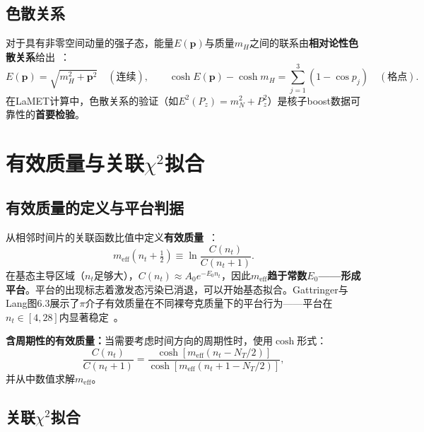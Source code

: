 \documentclass[12pt,a4paper]{ctexart}
\theoremstyle{definition}
\begin{document}
\subsection{色散关系}

对于具有非零空间动量的强子态，能量$E(\mathbf{p})$与质量$m_H$之间的联系由\textbf{相对论性色散关系}给出~\cite{GattringerLang2010}：
\begin{equation}
E(\mathbf{p}) = \sqrt{m_H^2 + \mathbf{p}^2} \quad (\text{连续}), \qquad
\cosh E(\mathbf{p}) - \cosh m_H = \sum_{j=1}^3 (1 - \cos p_j) \quad (\text{格点}).
\label{eq:dispersion}
\end{equation}
在LaMET计算中，色散关系的验证（如$E^2(P_z) = m_N^2 + P_z^2$）是核子boost数据可靠性的\textbf{首要检验}。

\section{有效质量与关联$\chi^2$拟合}

\subsection{有效质量的定义与平台判据}

从相邻时间片的关联函数比值中定义\textbf{有效质量}~\cite{GattringerLang2010}：
\begin{equation}
\boxed{m_{\text{eff}}(n_t + \tfrac{1}{2}) \equiv \ln\frac{C(n_t)}{C(n_t+1)}}.
\label{eq:eff_mass}
\end{equation}
在基态主导区域（$n_t$足够大），$C(n_t) \approx A_0 e^{-E_0 n_t}$，因此\textbf{$m_{\text{eff}}$趋于常数$E_0$——形成平台}。平台的出现标志着激发态污染已消退，可以开始基态拟合。Gattringer与Lang图6.3展示了$\pi$介子有效质量在不同裸夸克质量下的平台行为——平台在$n_t \in [4, 28]$内显著稳定~\cite{GattringerLang2010}。

\textbf{含周期性的有效质量：}当需要考虑时间方向的周期性时，使用$\cosh$形式：
\begin{equation}
\frac{C(n_t)}{C(n_t+1)} = \frac{\cosh[m_{\text{eff}}(n_t - N_T/2)]}{\cosh[m_{\text{eff}}(n_t + 1 - N_T/2)]},
\label{eq:eff_mass_periodic}
\end{equation}
并从中数值求解$m_{\text{eff}}$。

\subsection{关联$\chi^2$拟合}
\end{document}
